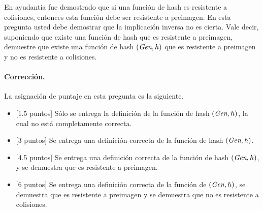 
En ayudantía fue demostrado que si una función de hash es resistente a
colisiones, entonces esta función debe ser resistente a preimagen. En
esta pregunta usted debe demostrar que la implicación inversa no es
cierta. Vale decir, suponiendo que existe una función de hash que es
resistente a preimagen, demuestre que existe una función de hash
$(\textit{Gen}, h)$ que es resistente a preimagen y no es resistente
a colisiones.

\medskip

\paragraph{Corrección.}
La asignación de puntaje en esta pregunta es la siguiente.
\begin{itemize}
    \item{[1.5 puntos]} Sólo se entrega la definición de la función de
    hash $(\textit{Gen}, h)$, la cual no está completamente correcta.

\item{[3 puntos]} Se entrega una definición correcta de la función de
    hash $(\textit{Gen}, h)$.

    \item{[4.5 puntos]} Se entrega una definición correcta de la función de
    hash $(\textit{Gen}, h)$, y se demuestra que es resistente a preimagen. 

    \item{[6 puntos]} Se entrega una definición correcta de la función de
    $(\textit{Gen}, h)$, se demuestra que es resistente a preimagen y se
    demuestra que no es resistente a colisiones.
\end{itemize}

\medskip
